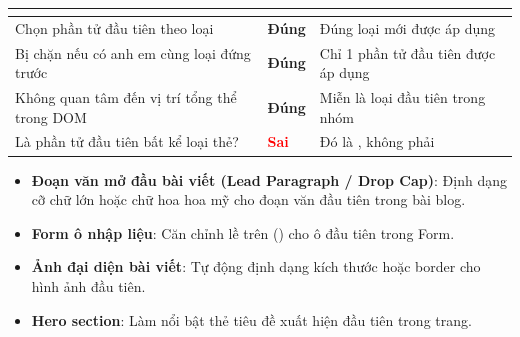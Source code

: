 \begin{prettyTableBox}
\sffamily\small
\begin{tabularx}{\linewidth}{|Z|>{\centering\arraybackslash\bfseries}m{2.2cm}|>{\raggedright\arraybackslash}m{4.2cm}|}
\hline
{}  &  &  \\
\hline
Chọn phần tử đầu tiên theo loại & \textcolor{green!70!black}{Đúng} & Đúng loại mới được áp dụng \\
\hline
Bị chặn nếu có anh em cùng loại đứng trước & \textcolor{green!70!black}{Đúng} & Chỉ 1 phần tử đầu tiên được áp dụng \\
\hline
Không quan tâm đến vị trí tổng thể trong DOM & \textcolor{green!70!black}{Đúng} & Miễn là loại đầu tiên trong nhóm \\
\hline
Là phần tử đầu tiên bất kể loại thẻ? & \textcolor{red}{\textbf{Sai}} & Đó là , không phải  \\
\hline
\end{tabularx}
\end{prettyTableBox}

\begin{conceptBox}
\begin{itemize}[leftmargin=1.5em, itemsep=3pt, parsep=0pt]
    \item \textbf{Đoạn văn mở đầu bài viết (Lead Paragraph / Drop Cap)}: Định dạng cỡ chữ lớn hoặc chữ hoa hoa mỹ cho đoạn văn đầu tiên trong bài blog.
    \item \textbf{Form ô nhập liệu}: Căn chỉnh lề trên () cho ô  đầu tiên trong Form.
    \item \textbf{Ảnh đại diện bài viết}: Tự động định dạng kích thước hoặc border cho hình ảnh  đầu tiên.
    \item \textbf{Hero section}: Làm nổi bật thẻ tiêu đề  xuất hiện đầu tiên trong trang.
\end{itemize}
\end{conceptBox}


